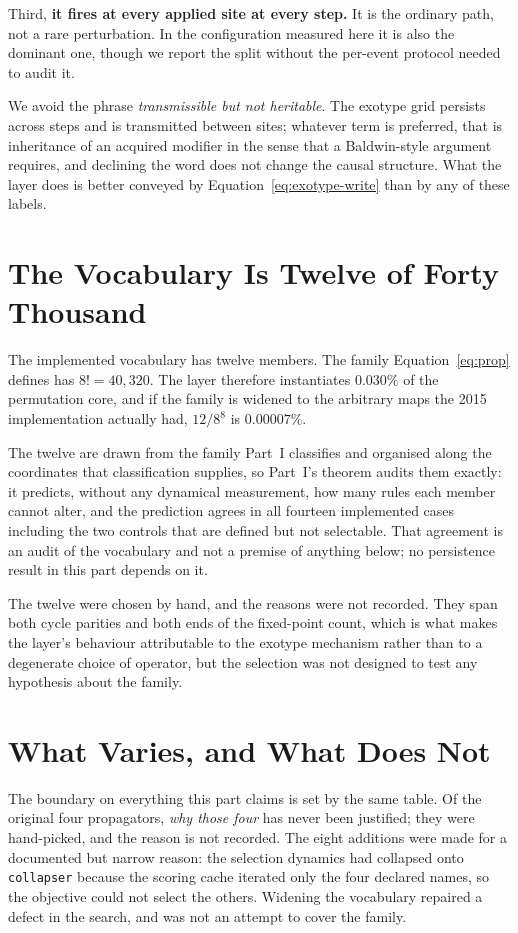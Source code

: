 Third, \textbf{it fires at every applied site at every step.} It is the ordinary
path, not a rare perturbation. In the configuration measured here it is also the
dominant one, though we report the split without the per-event protocol needed to audit
it.

We avoid the phrase \emph{transmissible but not heritable}. The exotype grid
persists across steps and is transmitted between sites; whatever term is
preferred, that is inheritance of an acquired modifier in the sense that a
Baldwin-style argument requires, and declining the word does not change the
causal structure. What the layer does is better conveyed by
Equation~\eqref{eq:exotype-write} than by any of these labels.

\section{The Vocabulary Is Twelve of Forty Thousand}
\label{sec:exotype-vocabulary}

The implemented vocabulary has twelve members. The family
Equation~\eqref{eq:prop} defines has $8! = 40{,}320$. The layer therefore
instantiates $0.030\%$ of the permutation core, and if the family is widened to
the arbitrary maps the 2015 implementation actually had, $12/8^8$ is
$0.00007\%$.

The twelve are drawn from the family Part~I classifies and organised along the
coordinates that classification supplies, so Part~I's theorem audits them exactly: it
predicts, without any dynamical measurement, how many rules each member cannot alter,
and the prediction agrees in all fourteen implemented cases including the two controls
that are defined but not selectable. That agreement is an audit of the vocabulary and
not a premise of anything below; no persistence result in this part depends on it.

The twelve were chosen by hand, and the reasons were not recorded. They span both cycle
parities and both ends of the fixed-point count, which is what makes the layer's
behaviour attributable to the exotype mechanism rather than to a degenerate choice of
operator, but the selection was not designed to test any hypothesis about the family.

\section{What Varies, and What Does Not}
\label{sec:exotype-scope}

The boundary on everything this part claims is set by the same table. Of the
original four propagators, \emph{why those four} has never been justified; they
were hand-picked, and the reason is not recorded. The eight additions were made
for a documented but narrow reason: the selection dynamics had collapsed onto
\texttt{collapser} because the scoring cache iterated only the four declared
names, so the objective could not select the others. Widening the vocabulary
repaired a defect in the search, and was not an attempt to cover the family.

